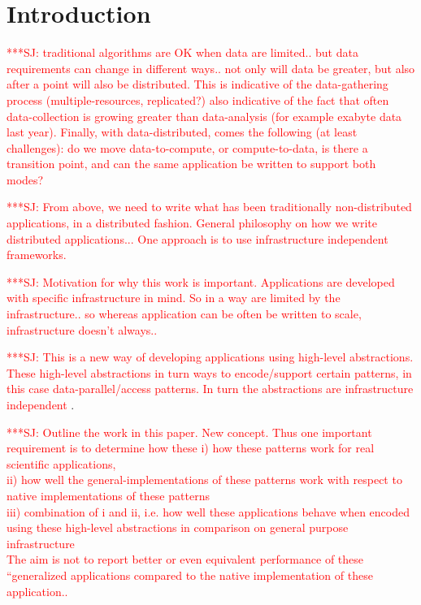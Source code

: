 \documentclass[conference,final]{IEEEtran}
\newcommand{\jhanote}[1]{ {\textcolor{red} { ***SJ: #1 }}}
\newcommand{\jhanote}[1]{}
\begin{document}
\section{Introduction} 


\jhanote{traditional algorithms are OK when data are limited.. but
  data requirements can change in different ways.. not only will data
  be greater, but also after a point will also be distributed. This is
  indicative of the data-gathering process (multiple-resources,
  replicated?) also indicative of the fact that often data-collection
  is growing greater than data-analysis (for example exabyte data last
  year).  Finally, with data-distributed, comes the following (at
  least challenges): do we move data-to-compute, or compute-to-data,
  is there a transition point, and can the same application be written
  to support both modes?}

\jhanote{From above, we need to write what has been traditionally
  non-distributed applications, in a distributed fashion. General
  philosophy on how we write distributed applications... One approach
  is to use infrastructure independent frameworks.}

\jhanote{Motivation for why this work is important. Applications
  are developed with specific infrastructure in mind. So in a
  way are limited by the infrastructure.. so whereas application
  can be often be written to scale, infrastructure doesn't
  always..}

\jhanote{This is a new way of developing applications using high-level
  abstractions. These high-level abstractions in turn ways to
  encode/support certain patterns, in this case data-parallel/access
  patterns. In turn the abstractions are infrastructure independent}.


\jhanote{Outline the work in this paper. New concept. Thus one
  important requirement is to determine how these
  i) how these patterns work for real scientific applications, \\
  ii) how well the general-implementations of these patterns work with
  respect to native implementations of these patterns \\
  iii) combination of i and ii, i.e. how well these applications
  behave when encoded using these high-level abstractions
  in comparison on general purpose infrastructure\\
  The aim is not to report better or even equivalent performance of
  these ``generalized applications compared to the native
  implementation of these application..}
\end{document}
